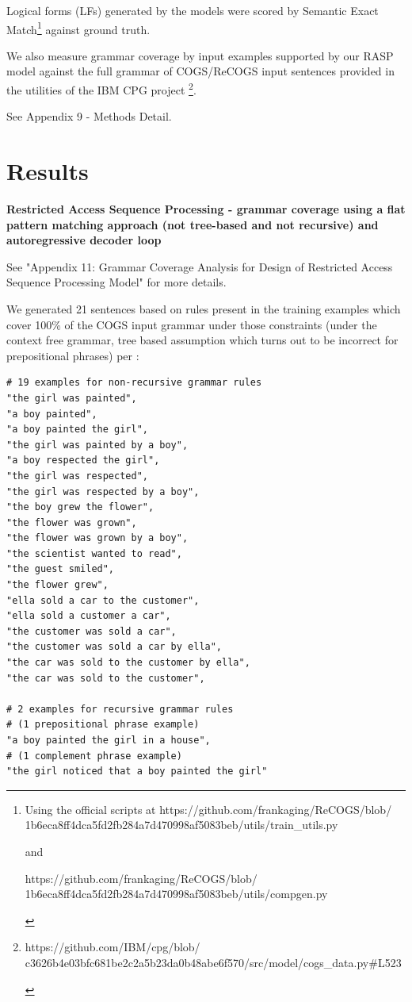 \documentclass[11pt]{article}
\begin{document}
Logical forms (LFs) generated by the models were scored by Semantic Exact Match\footnote{
\begin{tiny}
Using the official scripts at https://github.com/frankaging/ReCOGS/blob/
1b6eca8ff4dca5fd2fb284a7d470998af5083beb/utils/train\_utils.py

and

https://github.com/frankaging/ReCOGS/blob/
1b6eca8ff4dca5fd2fb284a7d470998af5083beb/utils/compgen.py
\end{tiny}
} against ground truth.

We also measure grammar coverage by input examples supported by our RASP model against the full grammar of COGS/ReCOGS input sentences provided in the utilities of the IBM CPG project \cite{klinger2024compositionalprogramgenerationfewshot}\footnote{
\begin{tiny}
https://github.com/IBM/cpg/blob/
c3626b4e03bfc681be2c2a5b23da0b48abe6f570/src/model/cogs\_data.py\#L523 
\end{tiny}
}.

See Appendix 9 - Methods Detail.
\section{Results}
\textbf{Restricted Access Sequence Processing - grammar coverage using a flat pattern matching approach (not tree-based and not recursive) and autoregressive decoder loop}

See "Appendix 11: Grammar Coverage Analysis for Design of Restricted Access Sequence Processing Model" for more details.

We generated 21 sentences based on rules present in the training examples which cover 100\% of the COGS input grammar under those constraints (under the context free grammar, tree based assumption which turns out to be incorrect for prepositional phrases) per \cite{fuzzingbook2023:GrammarCoverageFuzzer}:

\begin{tiny}
\begin{verbatim}
# 19 examples for non-recursive grammar rules
"the girl was painted", 
"a boy painted",
"a boy painted the girl",
"the girl was painted by a boy",
"a boy respected the girl", 
"the girl was respected",
"the girl was respected by a boy",
"the boy grew the flower",
"the flower was grown",
"the flower was grown by a boy",
"the scientist wanted to read",
"the guest smiled",
"the flower grew",
"ella sold a car to the customer",
"ella sold a customer a car",
"the customer was sold a car",
"the customer was sold a car by ella",
"the car was sold to the customer by ella",
"the car was sold to the customer",

# 2 examples for recursive grammar rules
# (1 prepositional phrase example)
"a boy painted the girl in a house",
# (1 complement phrase example)
"the girl noticed that a boy painted the girl"
\end{verbatim}
\end{tiny}
\end{document}
